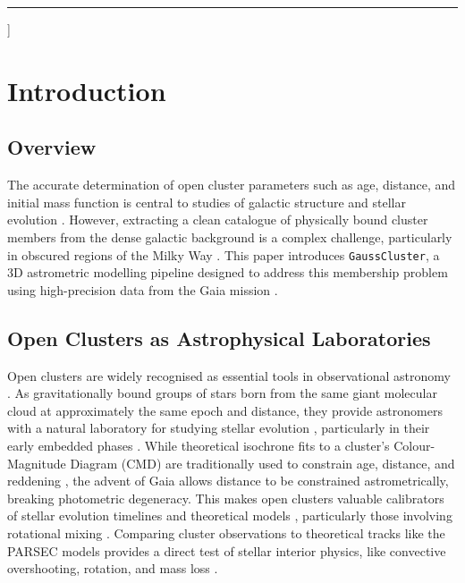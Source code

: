 \documentclass{CU_IOPStyle_PXT999}
\begin{document}
\par\noindent\rule{\textwidth}{0.5pt}
\vspace{0.5cm}
]

\section{Introduction}
\label{ssec:1}

\subsection{Overview}
\label{ssec:1.1}
The accurate determination of open cluster parameters such as age, distance, and initial mass function is central to studies of galactic structure and stellar evolution \cite{portegies_zwart_star_2001}. However, extracting a clean catalogue of physically bound cluster members from the dense galactic background is a complex challenge, particularly in obscured regions of the Milky Way \cite{cantat-gaudin_milky_2022, de_la_fuente_clustered_2021}. This paper introduces \texttt{GaussCluster}, a 3D astrometric modelling pipeline designed to address this membership problem using high-precision data from the Gaia mission \cite{gaia_collaboration_gaia_2023}.

\subsection{Open Clusters as Astrophysical Laboratories}
\label{ssec:1.2}
Open clusters are widely recognised as essential tools in observational astronomy \cite{cantat-gaudin_milky_2022}. As gravitationally bound groups of stars born from the same giant molecular cloud at approximately the same epoch and distance, they provide astronomers with a natural laboratory for studying stellar evolution \cite{portegies_zwart_star_2001}, particularly in their early embedded phases \cite{lada_embedded_2003}. While theoretical isochrone fits to a cluster's Colour-Magnitude Diagram (CMD) are traditionally used to constrain age, distance, and reddening \cite{bressan_span_2012}, the advent of Gaia allows distance to be constrained astrometrically, breaking photometric degeneracy. This makes open clusters valuable calibrators of stellar evolution timelines \cite{von_hippel_galactic_2005} and theoretical models \cite{bressan_span_2012}, particularly those involving rotational mixing \cite{meynet_stellar_2000}. Comparing cluster observations to theoretical tracks like the PARSEC models provides a direct test of stellar interior physics, like convective overshooting, rotation, and mass loss \cite{bressan_span_2012}.
\end{document}
